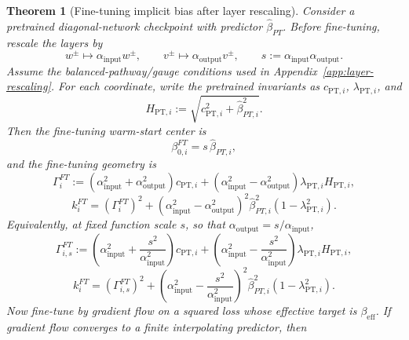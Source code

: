 \documentclass[11pt]{article}
\newtheorem{theorem}{Theorem}
\begin{document}
\begin{theorem}[Fine-tuning implicit bias after layer rescaling]
\label{thm:rescaled-finetuning-bias}
Consider a pretrained diagonal-network checkpoint with predictor \(\widehat\beta_{PT}\). Before fine-tuning, rescale the layers by
\begin{equation}
    w^\pm\mapsto \alpha_{\mathrm{input}}w^\pm,
    \qquad
    v^\pm\mapsto \alpha_{\mathrm{output}}v^\pm,
    \qquad
    s:=\alpha_{\mathrm{input}}\alpha_{\mathrm{output}}.
\end{equation}
Assume the balanced-pathway/gauge conditions used in Appendix~\ref{app:layer-rescaling}. For each coordinate, write the pretrained invariants as \(c_{\mathrm{PT},i}\), \(\lambda_{\mathrm{PT},i}\), and
\begin{equation}
    H_{\mathrm{PT},i}
    :=
    \sqrt{c_{\mathrm{PT},i}^2+\widehat\beta_{PT,i}^2}.
\end{equation}
Then the fine-tuning warm-start center is
\begin{equation}
    \beta_{0,i}^{FT}
    =
    s\,\widehat\beta_{PT,i},
\end{equation}
and the fine-tuning geometry is
\begin{equation}
    \Gamma_i^{FT}
    :=
    (\alpha_{\mathrm{input}}^2+\alpha_{\mathrm{output}}^2)c_{\mathrm{PT},i}
    +
    (\alpha_{\mathrm{input}}^2-\alpha_{\mathrm{output}}^2)
    \lambda_{\mathrm{PT},i}H_{\mathrm{PT},i},
\end{equation}
\begin{equation}
    k_i^{FT}
    =
    (\Gamma_i^{FT})^2
    +
    (\alpha_{\mathrm{input}}^2-\alpha_{\mathrm{output}}^2)^2
    \widehat\beta_{PT,i}^2(1-\lambda_{\mathrm{PT},i}^2).
\end{equation}
Equivalently, at fixed function scale \(s\), so that \(\alpha_{\mathrm{output}}=s/\alpha_{\mathrm{input}}\),
\begin{equation}
    \Gamma_{i,s}^{FT}
    :=
    \left(\alpha_{\mathrm{input}}^2+\frac{s^2}{\alpha_{\mathrm{input}}^2}\right)c_{\mathrm{PT},i}
    +
    \left(\alpha_{\mathrm{input}}^2-\frac{s^2}{\alpha_{\mathrm{input}}^2}\right)
    \lambda_{\mathrm{PT},i}H_{\mathrm{PT},i},
\end{equation}
\begin{equation}
    k_i^{FT}
    =
    (\Gamma_{i,s}^{FT})^2
    +
    \left(\alpha_{\mathrm{input}}^2-\frac{s^2}{\alpha_{\mathrm{input}}^2}\right)^2
    \widehat\beta_{PT,i}^2(1-\lambda_{\mathrm{PT},i}^2).
\end{equation}
Now fine-tune by gradient flow on a squared loss whose effective target is \(\beta_{\mathrm{eff}}\). If gradient flow converges to a finite interpolating predictor, then

\end{theorem}
\end{document}
